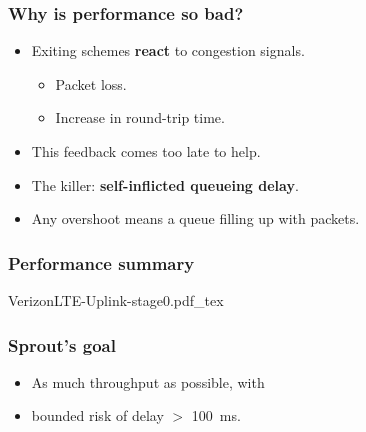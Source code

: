 \documentclass[svgnames]{beamer}
\begin{document}
\begin{frame}
\frametitle{Why is performance so bad?}

\begin{itemize}
\item Exiting schemes \textbf{react} to congestion signals.

\begin{itemize}
\item Packet loss.
\item Increase in round-trip time.
\end{itemize}

\item This feedback comes too late to help.

\item The killer: \textbf{self-inflicted queueing delay}.

\item Any overshoot means a queue filling up with packets.

\end{itemize}

\end{frame}

\begin{frame}
\frametitle{Performance summary}
\vspace{-1 cm}
\def\svgwidth{\columnwidth}\footnotesize{VerizonLTE-Uplink-stage0.pdf_tex}
\end{frame}

\begin{frame}
\frametitle{Sprout's goal}

\begin{itemize}
\item As much throughput as possible, with
\item bounded risk of delay $>$ 100~ms.
\end{itemize}

\end{frame}
\end{document}
